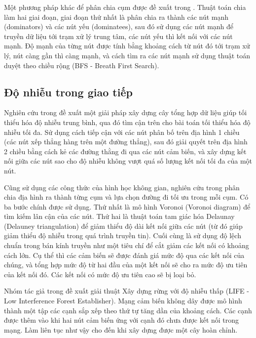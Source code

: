 Một phương pháp khác để phân chia cụm được đề xuất trong \cite{xu2010delay}. Thuật toán chia làm hai giai đoạn, giai đoạn thứ nhất là phân chia ra thành các nút mạnh (dominators) và các nút yếu (dominatees), sau đó sử dụng các nút mạnh để truyền dữ liệu tới trạm xử lý trung tâm, các nút yếu thì kết nối với các nút mạnh. Độ mạnh của từng nút được tính bằng khoảng cách từ nút đó tới trạm xử lý, nút càng gần thì càng mạnh, và cách tìm ra các nút mạnh sử dụng thuật toán duyệt theo chiều rộng (BFS - Breath First Search).

\subsection{Độ nhiễu trong giao tiếp}
Nghiên cứu trong \cite{lou2011minimizing} đề xuất một giải pháp xây dựng cây tổng hợp dữ liệu giúp tối thiểu hóa độ nhiễu trung bình, qua đó tìm cận trên cho bài toán tối thiểu hóa độ nhiễu tối đa. Sử dụng cách tiếp cận với các nút phân bố trên địa hình 1 chiều (các nút xếp thẳng hàng trên một đường thẳng), sau đó giải quyết trên địa hình 2 chiều bằng cách kẻ các đường thằng đi qua các nút cảm biến, và xây dựng kết nối giữa các nút sao cho độ nhiễu không vượt quá số lượng kết nối tối đa của một nút.


Cũng sử dụng các công thức của hình học không gian, nghiên cứu trong \cite{jang2010applications} phân chia địa hình ra thành từng cụm và lựa chọn đường đi tối ưu trong mỗi cụm. Có ba bước chính được sử dụng. Thứ nhất là mô hình Voronoi (Voronoi diagram) để tìm kiếm lân cận của các nút. Thứ hai là thuật toán tam giác hóa Delaunay (Delauney triangulation) để giảm thiểu độ dài kết nối giữa các nút (từ đó giúp giảm thiểu độ nhiễu trong quá trình truyền tin). Cuối cùng là sử dụng độ lệch chuẩn trong bán kính truyền như một tiêu chí để cắt giảm các kết nối có khoảng cách lớn. Cụ thể thì các cảm biến sẽ được đánh giá mức độ qua các kết nối của chúng, và tổng hợp mức độ từ hai đầu của một kết nối sẽ cho ra mức độ ưu tiên của kết nối đó. Các kết nối có mức độ ưu tiên cao sẽ bị loại bỏ.


Nhóm tác giả trong \cite{burkhart2004does} đề xuất giải thuật Xây dựng rừng với độ nhiễu thấp (LIFE - Low Interference Forest Establisher). Mạng cảm biến không dây được mô hình thành một tập các cạnh sắp xếp theo thứ tự tăng dần của khoảng cách. Các cạnh được thêm vào khi hai nút cảm biến ứng với cạnh đó chưa được kết nối trong mạng. Làm liên tục như vậy cho đến khi xây dựng được một cây hoàn chỉnh.
